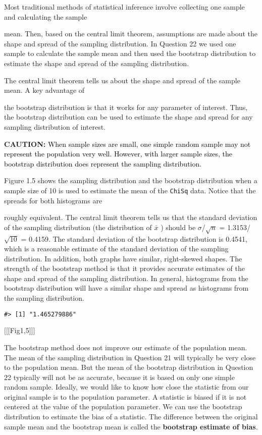 \documentclass[
]{report}
\theoremstyle{definition}
\theoremstyle{definition}
\theoremstyle{definition}
\theoremstyle{definition}
\theoremstyle{remark}
\begin{document}
Most traditional methods of statistical inference involve collecting one sample and calculating the sample

mean. Then, based on the central limit theorem, assumptions are made about the shape and spread of the
sampling distribution. In Question 22 we used one sample to calculate the sample mean and then used the
bootstrap distribution to estimate the shape and spread of the sampling distribution.

The central limit theorem tells us about the shape and spread of the sample mean. A key advantage of

the bootstrap distribution is that it works for any parameter of interest. Thus, the bootstrap distribution can be
used to estimate the shape and spread for any sampling distribution of interest.

\large

\textbf{CAUTION:}
\textcolor{black}{When sample sizes are small, one simple random sample may not represent the population very well.
However, with larger sample sizes, the bootstrap distribution does represent the sampling distribution.}

\normalsize

Figure 1.5 shows the sampling distribution and the bootstrap distribution when a sample size of 10 is used to estimate the mean of the \texttt{ChiSq} data. Notice that the spreads for both histograms are

roughly equivalent. The central limit theorem tells us that the standard deviation of the sampling distribution (the distribution of \(\bar{x}\) ) should be \(\sigma\)/\(\sqrt{n}\) = 1.3153/\(\sqrt{10}\) = 0.4159. The standard deviation of the bootstrap distribution is 0.4541, which is a reasonable estimate of the standard deviation of the sampling distribution. In addition, both graphs have similar, right-skewed shapes. The strength of the bootstrap method is that it provides accurate estimates of the shape and spread of the sampling distribution. In general, histograms from the bootstrap distribution will have a similar shape and spread as histograms
from the sampling distribution.

\begin{verbatim}
#> [1] "1.465279886"
\end{verbatim}

{[}{[}{[}Fig1,5{]}{]}{]}

The bootstrap method does not improve our estimate of the population mean. The mean of the sampling distribution in Question 21 will typically be very close to the population mean. But the mean of the bootstrap distribution in Question 22 typically will not be as accurate, because it is based on only one simple random sample. Ideally, we would like to know how close the statistic from our original sample is to the population parameter. A statistic is biased if it is not centered at the value of the population parameter. We can use the bootstrap distribution to estimate the bias of a statistic. The difference between the original sample mean and the bootstrap mean is called the \textbf{bootstrap estimate of bias}.
\end{document}
